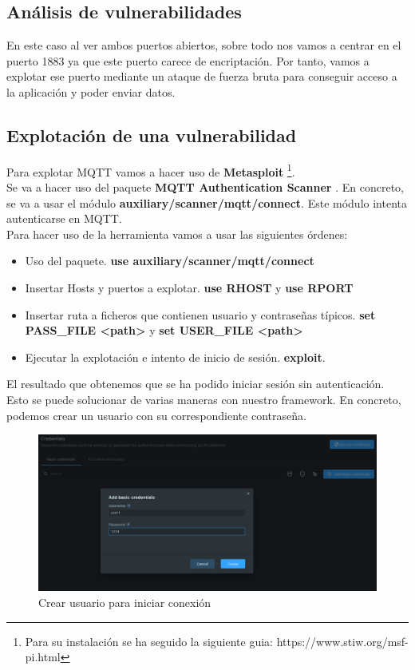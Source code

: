 \subsection{Análisis de vulnerabilidades}

En este caso al ver ambos puertos abiertos, sobre todo nos vamos a centrar en el puerto 1883 ya que este puerto carece de encriptación. Por tanto, vamos a explotar ese puerto mediante un ataque de fuerza bruta para conseguir acceso a la aplicación y poder enviar datos.

\subsection{Explotación de una vulnerabilidad}

Para explotar MQTT vamos a hacer uso de \textbf{Metasploit} \footnote{Para su instalación se ha seguido la siguiente guia: https://www.stiw.org/msf-pi.html}. \\

Se va a hacer uso del paquete \textbf{MQTT Authentication Scanner} \cite{use-metasploit-mqtt}. En concreto, se va a usar el módulo \textbf{auxiliary/scanner/mqtt/connect}. Este módulo intenta autenticarse en MQTT. \\

Para hacer uso de la herramienta vamos a usar las siguientes órdenes:

\begin{itemize}
    \item Uso del paquete. \textbf{use auxiliary/scanner/mqtt/connect}
    \item Insertar Hosts y puertos a explotar. \textbf{use RHOST} y \textbf{use RPORT}
    \item Insertar ruta a ficheros que contienen usuario y contraseñas típicos. \textbf{set PASS\_FILE <path>} y \textbf{set USER\_FILE <path>}
    \item Ejecutar la explotación e intento de inicio de sesión. \textbf{exploit}.
\end{itemize}

El resultado que obtenemos que se ha podido iniciar sesión sin autenticación. Esto se puede solucionar de varias maneras con nuestro framework. En concreto, podemos crear un usuario con su correspondiente contraseña. \\

\begin{figure}[p]
    \centering
    \includegraphics[width=\linewidth]{imagenes/Captura de pantalla 2022-06-13 180308.png}
    \caption{Crear usuario para iniciar conexión}
    \label{fig:figure11-imp}
\end{figure}

